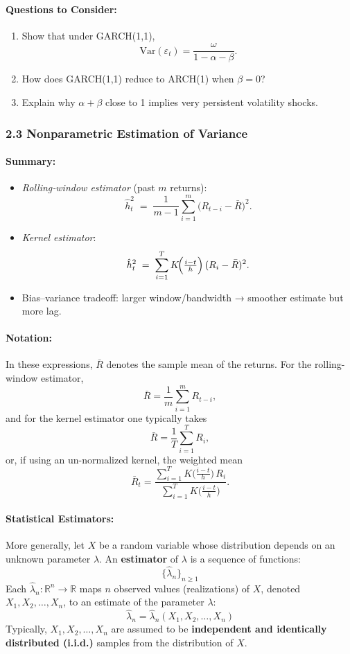 \documentclass[11pt]{amsart}
\begin{document}
\paragraph{Questions to Consider:}
\begin{enumerate}[noitemsep,left=0pt]
	\item Show that under GARCH(1,1), \[\mathrm{Var}(\varepsilon_t) = \frac{\omega}{1 - \alpha - \beta}.\]
	\item How does GARCH(1,1) reduce to ARCH(1) when $\beta = 0$?
	\item Explain why $\alpha + \beta$ close to 1 implies very persistent volatility shocks.
\end{enumerate}

\subsubsection{2.3 Nonparametric Estimation of Variance}
\paragraph{Summary:}
\begin{itemize}[noitemsep,left=0pt]
	\item \emph{Rolling‐window estimator} (past $m$ returns):
	      \[
		      \hat h_t^2 \;=\; \frac{1}{m - 1}\sum_{i=1}^m \bigl(R_{t-i} - \bar{R}\bigr)^2.
	      \]
	\item \emph{Kernel estimator}:
	      \[
		      \hat h_t^2 \;=\; \sum_{i=1}^T K\!\Bigl(\tfrac{i - t}{h}\Bigr)\,(R_i - \bar{R})^2.
	      \]
	\item Bias–variance tradeoff: larger window/bandwidth → smoother estimate but more lag.
\end{itemize}

\paragraph{Notation:} In these expressions, $\bar R$ denotes the sample mean of the returns. For the rolling-window estimator,
\[
	\bar R = \frac{1}{m}\sum_{i=1}^m R_{t-i},
\]
and for the kernel estimator one typically takes
\[
	\bar R = \frac{1}{T}\sum_{i=1}^T R_i,
\]
or, if using an un-normalized kernel, the weighted mean
\[
	\bar R_t = \frac{\sum_{i=1}^T K\bigl(\tfrac{i - t}{h}\bigr)\,R_i}{\sum_{i=1}^T K\bigl(\tfrac{i - t}{h}\bigr)}.
\]

\paragraph{Statistical Estimators:} More generally, let $X$ be a random variable whose distribution depends on an unknown parameter $\lambda$. An \textbf{estimator} of $\lambda$ is a sequence of functions:
\[
	\{ \hat{\lambda}_n \}_{n \geq 1}
\]
Each $\hat{\lambda}_n : \mathbb{R}^n \to \mathbb{R}$ maps $n$ observed values (realizations) of $X$, denoted $X_1, X_2, \ldots, X_n$, to an estimate of the parameter $\lambda$:
\[
	\hat{\lambda}_n = \hat{\lambda}_n(X_1, X_2, \ldots, X_n)
\]
Typically, $X_1, X_2, \ldots, X_n$ are assumed to be \textbf{independent and identically distributed (i.i.d.)} samples from the distribution of $X$.
\end{document}
